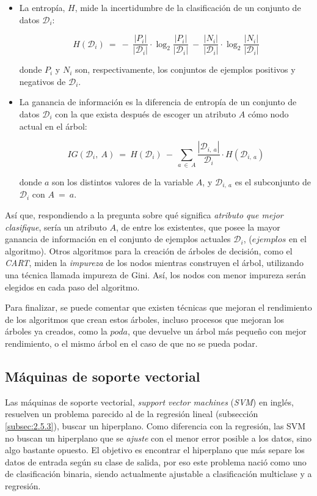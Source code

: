 \begin{itemize}
\item[\textbullet]La entropía, $H$, mide la incertidumbre de la clasificación de un conjunto de datos $\mathcal{D}_{i}$:

$$
H(\mathcal{D}_{i})\:=\:-\:\frac{|P_{i}|}{|\mathcal{D}_{i}|}\cdot\log_{2}\frac{|P_{i}|}{|\mathcal{D}_{i}|}\:-\:\frac{|N_{i}|}{|\mathcal{D}_{i}|}\cdot\log_{2}\frac{|N_{i}|}{|\mathcal{D}_{i}|}
$$

\noindent
donde $P_{i}$ y $N_{i}$ son, respectivamente, los conjuntos de ejemplos positivos y negativos de $\mathcal{D}_{i}$.

\item[\textbullet]La ganancia de información es la diferencia de entropía de un conjunto de datos $\mathcal{D}_{i}$ con la que exista después de escoger un atributo $A$ cómo nodo actual en el árbol:

$$
IG(\mathcal{D}_{i},\:A)\:=\:H(\mathcal{D}_{i})\:-\:\sum_{a\:\in\:A}\frac{|\mathcal{D}_{i,\:a}|}{\mathcal{D}_{i}}\cdot H(\mathcal{D}_{i,\:a})
$$

donde $a$ son los distintos valores de la variable $A$, y $\mathcal{D}_{i,\:a} $ es el subconjunto de $\mathcal{D}_{i}$ con $A\:=\:a$.
\end{itemize}

Así que, respondiendo a la pregunta sobre qué significa \emph{atributo que mejor clasifique}, sería un atributo $A$, de entre los existentes, que posee la mayor ganancia de información en el conjunto de ejemplos actuales $\mathcal{D}_{i}$, ($ejemplos$ en el algoritmo). Otros algoritmos para la creación de árboles de decisión, como el \emph{CART}, miden la \emph{impureza} de los nodos mientras construyen el árbol, utilizando una técnica llamada impureza de Gini. Así, los nodos con menor impureza serán elegidos en cada paso del algoritmo.

Para finalizar, se puede comentar que existen técnicas que mejoran el rendimiento de los algoritmos que crean estos árboles, incluso procesos que mejoran los árboles ya creados, como la $poda$, que devuelve un árbol más pequeño con mejor rendimiento, o el mismo árbol en el caso de que no se pueda podar.

\subsection{Máquinas de soporte vectorial} \label{subsec:3.1.2}

Las máquinas de soporte vectorial, \emph{support vector machines} (\emph{SVM}) en inglés, resuelven un problema parecido al de la regresión lineal (subsección \ref{subsec:2.5.3}), buscar un hiperplano. Como diferencia con la regresión, las SVM no buscan un hiperplano que se \emph{ajuste} con el menor error posible a los datos, sino algo bastante opuesto. El objetivo es encontrar el hiperplano que más separe los datos de entrada según su clase de salida, por eso este problema nació como uno de clasificación binaria, siendo actualmente ajustable a clasificación multiclase y a regresión.

